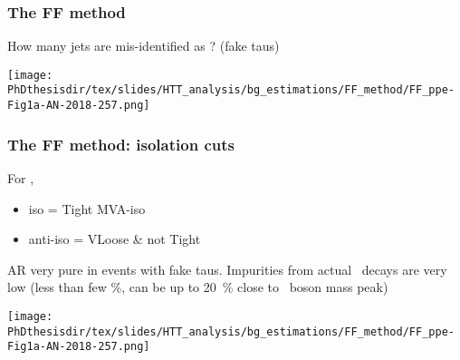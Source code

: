 \begin{frame}
\frametitle{The FF method}

\manip How many jets are mis-identified as \tauh? (fake taus)

\pause

\begin{center}
\texttt{[image: \\PhDthesisdir/tex/slides/HTT\_analysis/bg\_estimations/FF\_method/FF\_ppe-Fig1a-AN-2018-257.png]}
\end{center}
\end{frame}

\begin{frame}
\frametitle{The FF method: isolation cuts}

\begin{minipage}[c]{.45\textwidth}
For \tauh,
\begin{itemize}
\item iso = Tight MVA-iso
\item anti-iso = VLoose \& not Tight %
\end{itemize}

\manip AR very pure in events with fake taus.
\manip Impurities from actual \tauh\ decays are very low (less than few \%, can be up to \SI{20}{\%} close to \Zboson\ boson mass peak)
\end{minipage}
\hfill
\begin{minipage}[c]{.45\textwidth}
\begin{center}
\texttt{[image: \\PhDthesisdir/tex/slides/HTT\_analysis/bg\_estimations/FF\_method/FF\_ppe-Fig1a-AN-2018-257.png]}
\end{center}
\end{minipage}

\end{frame}

